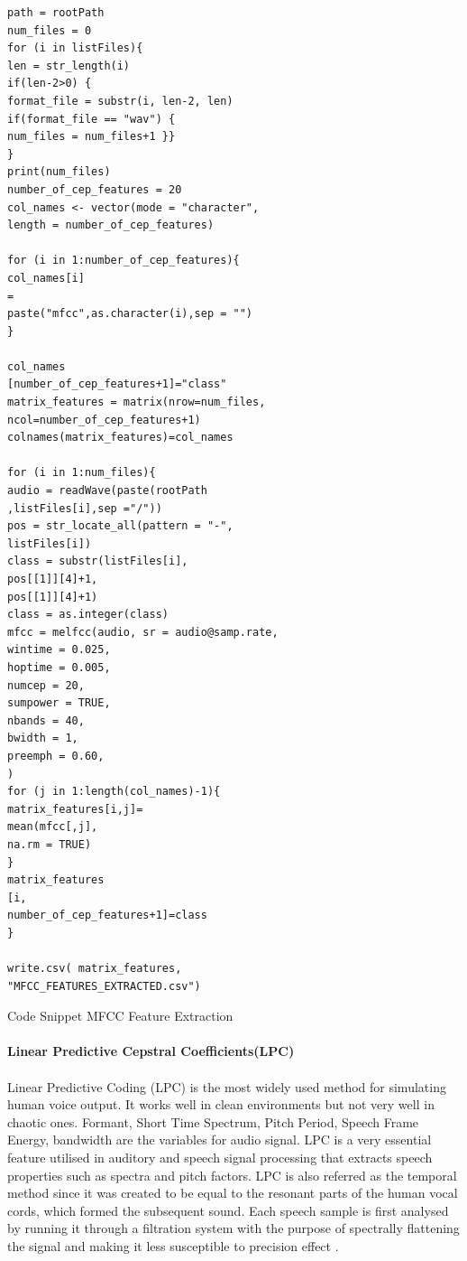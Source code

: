 \documentclass[11pt,a4paper]{article}
\begin{document}
\begin{verbatim}
path = rootPath
num_files = 0
for (i in listFiles){
len = str_length(i)
if(len-2>0) {
format_file = substr(i, len-2, len)
if(format_file == "wav") {
num_files = num_files+1 }}
}
print(num_files)
number_of_cep_features = 20
col_names <- vector(mode = "character",
length = number_of_cep_features)

for (i in 1:number_of_cep_features){
col_names[i]
=
paste("mfcc",as.character(i),sep = "")
}

col_names
[number_of_cep_features+1]="class"
matrix_features = matrix(nrow=num_files,
ncol=number_of_cep_features+1)
colnames(matrix_features)=col_names

for (i in 1:num_files){
audio = readWave(paste(rootPath
,listFiles[i],sep ="/"))
pos = str_locate_all(pattern = "-", 
listFiles[i])
class = substr(listFiles[i],
pos[[1]][4]+1,
pos[[1]][4]+1)
class = as.integer(class)
mfcc = melfcc(audio, sr = audio@samp.rate,
wintime = 0.025,        
hoptime = 0.005,        
numcep = 20,          
sumpower = TRUE,        
nbands = 40,            
bwidth = 1,             
preemph = 0.60,                        
) 
for (j in 1:length(col_names)-1){
matrix_features[i,j]=
mean(mfcc[,j],
na.rm = TRUE)
}
matrix_features
[i,
number_of_cep_features+1]=class
}
	
write.csv( matrix_features, 
"MFCC_FEATURES_EXTRACTED.csv")
	\end{verbatim}
Code Snippet MFCC Feature Extraction \\ \\
\textbf{Linear Predictive Cepstral Coefficients(LPC)} \\ \\ 
Linear Predictive Coding (LPC) is the most widely used method for simulating human voice output. It works well in clean environments but not very well in chaotic ones. Formant, Short Time Spectrum, Pitch Period, Speech Frame Energy,  bandwidth are the variables for audio signal. LPC is a very essential feature utilised in auditory and speech signal processing that extracts speech properties such as spectra and pitch factors. LPC is also referred as the temporal method since it was created to be equal to the resonant parts of the human vocal cords, which formed the subsequent sound. Each speech sample is first analysed by running it through a filtration system with the purpose of spectrally flattening the signal and making it less susceptible to precision effect \cite{ancilin2021improved}. 
\end{document}
